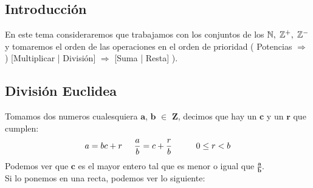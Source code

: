 \subsection{Introducción}
\noindent En este tema consideraremos que trabajamos con los conjuntos de los \(\mathbf{\mathbb{N},\hspace{1mm} \mathbb{Z}^+,\hspace{1mm}\mathbb{Z}^-}\) y tomaremos el orden de las operaciones en el orden de prioridad ( Potencias \(\Rightarrow\)) [Multiplicar | División] \(\Rightarrow \) [Suma | Resta] ).
\subsection{División Euclidea}
\noindent Tomamos dos numeros cualesquiera \(\mathbf{a}\), \(\mathbf{b}\) \(\mathbf{\in}\) \(\mathbf{Z}\), decimos que hay un \(\mathbf{c}\) y un \(\mathbf{r}\) que cumplen:
\[
        a = bc + r \hspace{5mm} \frac{a}{b} = c + \frac{r}{b} \hspace{1cm} 0\leq r< b
\]
\noindent Podemos ver que \(\mathbf{c}\) es el mayor entero tal que es menor o igual que \(\mathbf{\frac{a}{b}}\).\\
Si lo ponemos en una recta, podemos ver lo siguiente:
\vspace{5mm}
\begin{adjustwidth}{0em}{-8em}
\end{adjustwidth}
\noindent{} \par
